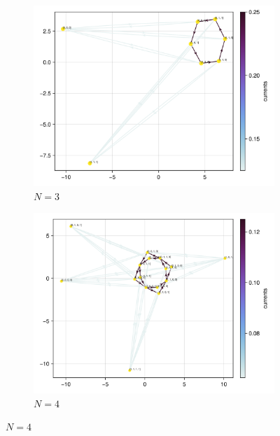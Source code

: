 \documentclass[11pt]{article}
\begin{document}
\begin{tcolorbox}
    \begin{figure}[H]
        \centering
        \begin{subfigure}[t]{0.49\textwidth}
            \centering
            \includegraphics[width=\textwidth]{../../plots/ones/c1/spring_N=3_metadata=(chash=5795298381321907906,ctype=simple).png}
            \caption{$N=3$}
        \end{subfigure}
        \begin{subfigure}[t]{0.49\textwidth}
            \centering
            \includegraphics[width=\textwidth]{../../plots/ones/c1/spring_N=4_metadata=(chash=5795298381321907906,ctype=simple).png}
            \caption{$N=4$}

\end{subfigure}
\end{figure}
\end{tcolorbox}
\end{document}
